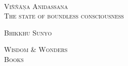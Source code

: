 \documentclass[10pt, openany]{book}
\begin{document}
\frontmatter

\pagestyle{empty}


\newpage~\newpage~

\begin{center}
\vspace{2em}

\Huge\Titlefont\scshape{Viññāṇa Anidassana}\\
\vspace{0.5em}
\large\Titlefont\scshape{The state of boundless consciousness}\\

\begin{Large}
\vspace{4em}
\Titlefont\scshape{Bhikkhu Sunyo}
\end{Large}


\vspace*{\fill}
\vspace{4pt}
\begin{small}
\scshape{Wisdom \& Wonders\\
Books}
\end{small}
\end{center}
\end{document}
